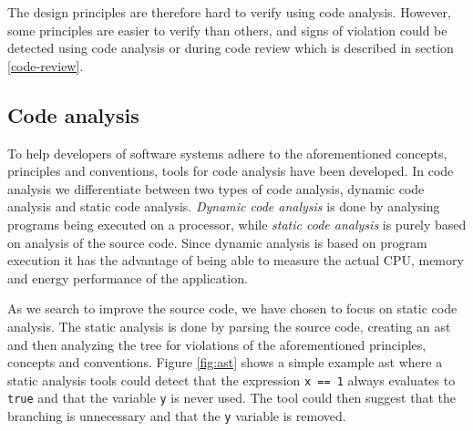 \documentclass{article}
\begin{document}
The design principles are therefore hard to verify using code analysis. However, some principles are easier to verify than others, and signs of violation could be detected using code analysis or during code review which is described in section \ref{code-review}.

\subsection{Code analysis}
To help developers of software systems adhere to the aforementioned concepts, principles and conventions, tools for code analysis have been developed. In code analysis we differentiate between two types of code analysis, dynamic code analysis and static code analysis. \textit{Dynamic code analysis} is done by analysing programs being executed on a processor, while \textit{static code analysis} is purely based on analysis of the source code. Since dynamic analysis is based on program execution it has the advantage of being able to measure the actual CPU, memory and energy performance of the application. 


As we search to improve the source code, we have chosen to focus on static code analysis. The static analysis is done by parsing the source code, creating an \gls{ast} and then analyzing the tree for violations of the aforementioned principles, concepts and conventions. Figure \ref{fig:ast} shows a simple example \gls{ast} where a static analysis tools could detect that the expression \texttt{x == 1} always evaluates to \texttt{true} and that the variable \texttt{y} is never used. The tool could then suggest that the branching is unnecessary and that the \texttt{y} variable is removed.  
\end{document}
